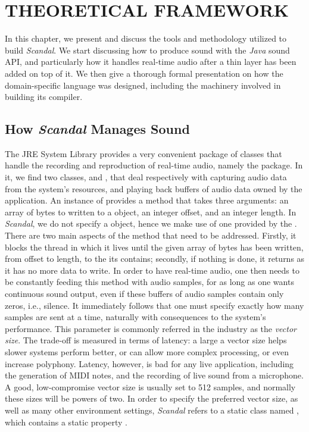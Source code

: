 \chapter{THEORETICAL FRAMEWORK}

In this chapter, we present and discuss the tools and methodology utilized to build \emph{Scandal}. We start discussing how to produce sound with the \emph{Java} sound API, and particularly how it handles real-time audio after a thin layer has been added on top of it. We then give a thorough formal presentation on how the domain-specific language was designed, including the machinery involved in building its compiler.

\section{How \emph{Scandal} Manages Sound}

The JRE System Library provides a very convenient package of classes that handle the recording and reproduction of real-time audio, namely the  package. In it, we find two classes,  and , that deal respectively with capturing audio data from the system's resources, and playing back buffers of audio data owned by the application. An instance of  provides a  method that takes three arguments: an array of bytes to written to a  object, an integer offset, and an integer length. In \emph{Scandal}, we do not specify a  object, hence we make use of one provided by the . There are two main aspects of the  method that need to be addressed. Firstly, it blocks the thread in which it lives until the given array of bytes has been written, from offset to length, to the  its  contains; secondly, if nothing is done, it returns as it has no more data to write. In order to have real-time audio, one then needs to be constantly feeding this  method with audio samples, for as long as one wants continuous sound output, even if these buffers of audio samples contain only zeros, i.e., silence. It immediately follows that one must specify exactly how many samples are sent at a time, naturally with consequences to the system's performance. This parameter is commonly referred in the industry as the \emph{vector size}. The trade-off is measured in terms of latency: a large a vector size helps slower systems perform better, or can allow more complex processing, or even increase polyphony. Latency, however, is bad for any live application, including the generation of MIDI notes, and the recording of live sound from a microphone. A good, low-compromise vector size is usually set to 512 samples, and normally these sizes will be powers of two. In order to specify the preferred vector size, as well as many other environment settings, \emph{Scandal} refers to a static class named , which contains a static property .

